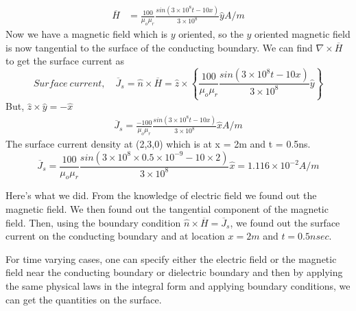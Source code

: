 \begin{exmp}
\begin{align*}
\overline{H} &= \frac{100}{\mu_o\mu_r}\frac{sin(3\times 10^8t -10x)}{3\times 10^8}\hat{y} A/m
\end{align*}
Now we have a magnetic field which is $y$ oriented, so the $y$ oriented magnetic field is now tangential to the surface of the conducting boundary. We can find $\nabla\times\overline{H}$ to get the surface current as
\begin{dmath*}
Surface\ current,\quad \overline{J}_s = \hat{n}\times\overline{H} = \hat{z}\times \left\lbrace \frac{100}{\mu_o\mu_r}\frac{sin(3\times 10^8t -10x)}{3\times 10^8}\hat{y} \right\rbrace  
\end{dmath*}
But, $\hat{z}\times\hat{y} = -\hat{x}$
\begin{align*}
\overline{J}_s = \frac{-100}{\mu_o\mu_r}\frac{sin(3\times 10^8t -10x)}{3\times 10^8}\hat{x} A/m
\end{align*}
The surface current density at (2,3,0) which is at x = 2m and t = 0.5ns.
\begin{dmath*}
\overline{J}_s = \frac{100}{\mu_o\mu_r}\frac{sin(3\times 10^8\times 0.5 \times 10^{-9} - 10\times 2)}{3\times 10^8}\hat{x} = 1.116\times 10^{-2} A/m
\end{dmath*}
\end{exmp} 
Here's what we did. From the knowledge of electric field we found out the magnetic field. We then found out the tangential component of the magnetic field. Then, using the boundary condition $\hat{n}\times\overline{H} = \overline{J}_s$, we found out the surface current on the conducting boundary and at location $x = 2m$ and $t = 0.5nsec$.

For time varying cases, one can specify either the electric field or the magnetic field near the conducting boundary or dielectric boundary and then by applying the same physical laws in the integral form and applying boundary conditions, we can get the quantities on the surface.
